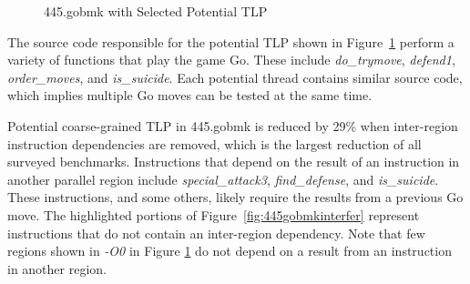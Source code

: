 \documentclass[defaultstyle,11pt]{thesis}
\begin{document}
\begin{figure}
  \centering
  \hspace{5mm}
  \caption{445.gobmk with Selected Potential TLP}
  \label{fig:445gobmkselInDoc}
\end{figure}

The source code responsible for the potential TLP shown in
Figure~\ref{fig:445gobmkselInDoc} perform a variety of functions that play
the game Go.  These include \textit{do\_trymove}, \textit{defend1},
\textit{order\_moves}, and \textit{is\_suicide}.  Each potential thread
contains similar source code, which implies multiple Go moves can be
tested at the same time.

Potential coarse-grained TLP in 445.gobmk is reduced by 29\% when
inter-region instruction dependencies are removed, which is the
largest reduction of all surveyed benchmarks.  Instructions that
depend on the result of an instruction in another parallel region
include \textit{special\_attack3}, \textit{find\_defense}, and
\textit{is\_suicide}.  These instructions, and some others, likely
require the results from a previous Go move.  The highlighted portions
of Figure~\ref{fig:445gobmkinterfer} represent instructions that do
not contain an inter-region dependency.  Note that few regions shown
in \textit{-O0} in Figure \ref{fig:445gobmkselInDoc} do not depend on a
result from an instruction in another region.
\end{document}
